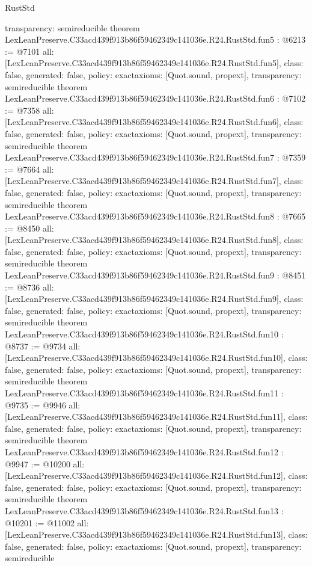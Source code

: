 \begin{lexlean}{RustStd}
\begin{coremodule}
{  transparency: semireducible
}
theorem LexLeanPreserve.C33acd439f913b86f59462349c141036e.R24.RustStd.fun5 : @6213 := @7101 {
  all: [LexLeanPreserve.C33acd439f913b86f59462349c141036e.R24.RustStd.fun5],
  class: false,
  generated: false,
  policy: exact{axioms: [Quot.sound, propext]},
  transparency: semireducible
}
theorem LexLeanPreserve.C33acd439f913b86f59462349c141036e.R24.RustStd.fun6 : @7102 := @7358 {
  all: [LexLeanPreserve.C33acd439f913b86f59462349c141036e.R24.RustStd.fun6],
  class: false,
  generated: false,
  policy: exact{axioms: [Quot.sound, propext]},
  transparency: semireducible
}
theorem LexLeanPreserve.C33acd439f913b86f59462349c141036e.R24.RustStd.fun7 : @7359 := @7664 {
  all: [LexLeanPreserve.C33acd439f913b86f59462349c141036e.R24.RustStd.fun7],
  class: false,
  generated: false,
  policy: exact{axioms: [Quot.sound, propext]},
  transparency: semireducible
}
theorem LexLeanPreserve.C33acd439f913b86f59462349c141036e.R24.RustStd.fun8 : @7665 := @8450 {
  all: [LexLeanPreserve.C33acd439f913b86f59462349c141036e.R24.RustStd.fun8],
  class: false,
  generated: false,
  policy: exact{axioms: [Quot.sound, propext]},
  transparency: semireducible
}
theorem LexLeanPreserve.C33acd439f913b86f59462349c141036e.R24.RustStd.fun9 : @8451 := @8736 {
  all: [LexLeanPreserve.C33acd439f913b86f59462349c141036e.R24.RustStd.fun9],
  class: false,
  generated: false,
  policy: exact{axioms: [Quot.sound, propext]},
  transparency: semireducible
}
theorem LexLeanPreserve.C33acd439f913b86f59462349c141036e.R24.RustStd.fun10 : @8737 := @9734 {
  all: [LexLeanPreserve.C33acd439f913b86f59462349c141036e.R24.RustStd.fun10],
  class: false,
  generated: false,
  policy: exact{axioms: [Quot.sound, propext]},
  transparency: semireducible
}
theorem LexLeanPreserve.C33acd439f913b86f59462349c141036e.R24.RustStd.fun11 : @9735 := @9946 {
  all: [LexLeanPreserve.C33acd439f913b86f59462349c141036e.R24.RustStd.fun11],
  class: false,
  generated: false,
  policy: exact{axioms: [Quot.sound, propext]},
  transparency: semireducible
}
theorem LexLeanPreserve.C33acd439f913b86f59462349c141036e.R24.RustStd.fun12 : @9947 := @10200 {
  all: [LexLeanPreserve.C33acd439f913b86f59462349c141036e.R24.RustStd.fun12],
  class: false,
  generated: false,
  policy: exact{axioms: [Quot.sound, propext]},
  transparency: semireducible
}
theorem LexLeanPreserve.C33acd439f913b86f59462349c141036e.R24.RustStd.fun13 : @10201 := @11002 {
  all: [LexLeanPreserve.C33acd439f913b86f59462349c141036e.R24.RustStd.fun13],
  class: false,
  generated: false,
  policy: exact{axioms: [Quot.sound, propext]},
  transparency: semireducible
}
\end{coremodule}
\end{lexlean}
